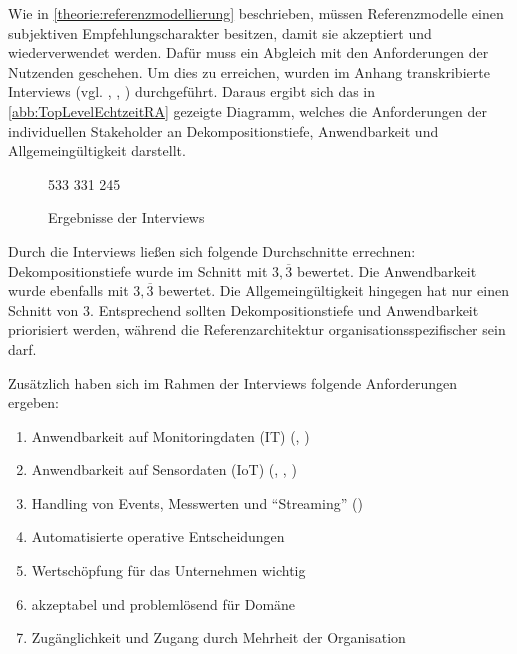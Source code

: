 Wie in \autoref{theorie:referenzmodellierung} beschrieben, müssen Referenzmodelle einen subjektiven Empfehlungscharakter besitzen, damit sie akzeptiert und wiederverwendet werden. Dafür muss ein Abgleich mit den Anforderungen der Nutzenden geschehen. Um dies zu erreichen, wurden im Anhang transkribierte Interviews (vgl. , , ) durchgeführt. Daraus ergibt sich das in \autoref{abb:TopLevelEchtzeitRA} gezeigte Diagramm, welches die Anforderungen der individuellen Stakeholder an Dekompositionstiefe, Anwendbarkeit und Allgemeingültigkeit darstellt.

\begin{figure}[H]
\centering
\spideroverview
{5}{3}{3}
{3}{3}{1}
{2}{4}{5}
\caption{Ergebnisse der Interviews}
\label{abb:DimensionenUebersicht}
\end{figure}
Durch die Interviews ließen sich folgende Durchschnitte errechnen: Dekompositionstiefe wurde im Schnitt mit $3,\overline{3}$ bewertet. Die Anwendbarkeit wurde ebenfalls mit $3,\overline{3}$ bewertet. Die Allgemeingültigkeit hingegen hat nur einen Schnitt von $3$. Entsprechend sollten Dekompositionstiefe und Anwendbarkeit priorisiert werden, während die Referenzarchitektur organisationsspezifischer sein darf. 

Zusätzlich haben sich im Rahmen der Interviews folgende Anforderungen ergeben:
\begin{enumerate}
\item Anwendbarkeit auf Monitoringdaten (IT) (, )
\item Anwendbarkeit auf Sensordaten (\ac{IoT}) (, , )
\item Handling von Events, Messwerten und \enquote{Streaming} ()
\item Automatisierte operative Entscheidungen
\item \label{anforderung:wertschöpfung} Wertschöpfung für das Unternehmen wichtig
\item \label{anforderung:akzeptabel} akzeptabel und problemlösend für Domäne
\item \label{anforderung:zugänglichkeit} Zugänglichkeit und Zugang durch Mehrheit der Organisation
\end{enumerate}

